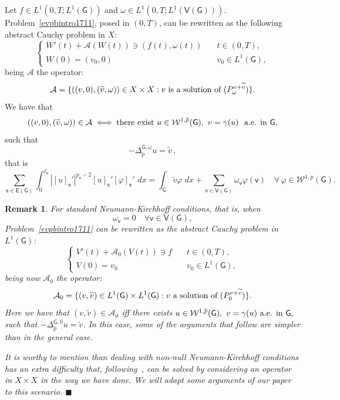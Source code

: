 \documentclass[reqno,12pt]{amsart}
\newtheorem{remark}[theorem]{Remark}
\def\e{\mathsf{e}} 	%
\def\v{\mathsf{v}}	%
\newcommand{\G}{\mathsf{G}}	%
\newcommand{\V}{\mathsf{V}}	%
\newcommand{\E}{\mathsf{E}}	%
\numberwithin{equation}{section} %
\begin{document}
Let    $f\in L^1(0,T;L^{1}(\G))$ and $\omega\in L^1(0,T;L^1(\V(\G)))$. Problem~\eqref{evpbintro1711},  posed in $(0,T)$, can be rewritten 
as  the following abstract Cauchy problem in $X$:
\begin{equation}\label{ACPI}
\left\{ \begin{array}{ll} W'(t) + \mathcal{A} (W(t)) \ni (f(t),\omega(t)) \quad &  t \in (0,T), \\[10pt] W(0) = (v_0,0) \quad & v_0  \in L^1(\G),   \end{array} \right.
\end{equation}
being $\mathcal{A} $ the operator:
$$
\mathcal{A}  =  \{((v,0), (\widetilde v,\omega)) \in  X\times X  :   v \hbox{ is a solution of } (P_{\omega}^{v+\widetilde v})\}.$$
   We have that $$((v,0), (\widetilde v,\omega)) \in \mathcal{A} \iff \hbox{there exist } u\in \mathcal{W}^{1,\overline{p}}(\G), \ v=\gamma(u)\ \hbox{ a.e. in } \G,$$
such that
 $$-\Delta_{\overline{p}}^{\G,\omega}u=\tilde v\,,$$ that is
\begin{equation}\label{Weak1rep01} \sum_{\e \in\E(\G)}\int_{0}^{\ell_\e}|[u]_\e'|^{p_\e-2}[u]_\e' [\varphi]_\e' \, \,dx  = \int_\G \widetilde v \varphi \, \,dx +   \sum_{\v\in \V(\G)}\omega_\v\varphi(\v)\quad \forall \, \varphi \in \mathcal{W}^{1,\overline{p}}(\G). \end{equation}
 
 
\begin{remark}\rm 
For standard Neumann-Kirchhoff conditions, that is, when $$\omega_\v=0\quad\forall\v\in\V(\G),$$ Problem~\eqref{evpbintro1711} can be rewritten  as the abstract Cauchy problem in $L^{1}(\G)$:
\begin{equation}\label{ACPIsub0}
\left\{ \begin{array}{ll} V'(t) + \mathcal{A}_0 (V(t)) \ni f \quad &  t \in (0,T), \\[10pt] V(0) = v_0 \quad & v_0 \in L^1(\G),   \end{array} \right.
\end{equation}
being now $\mathcal{A}_0 $ the operator:
$$
\mathcal{A}_0  =  \{(v, \widetilde v) \in L^{1}(\G) \times L^{1}(\G)   :  v \hbox{ a solution of } (P_{0}^{v+\widetilde v})\}.$$
Here we have that $(v,\tilde v)\in \mathcal{A}_0$ iff there exists $u\in \mathcal{W}^{1,\overline{p}}(\G), \ v=\gamma(u)  \hbox{ a.e. in } \G,$
such that
 $-\Delta_{\overline{p}}^{\G,0}u=\tilde v$. In this case, some of the arguments that follow are simpler than in the general case.

It is worthy to mention than dealing with non-null Neumann-Kirchhoff conditions has an extra difficulty that, following~\cite{AndIgMazTo06}, can be solved by considering an operator in  $X\times X$ in the way we have done. We will adapt some arguments of our paper~\cite{AndIgMazTo06}  to this scenario.  
   \hfill $\blacksquare$
\end{remark}
 
\end{document}
